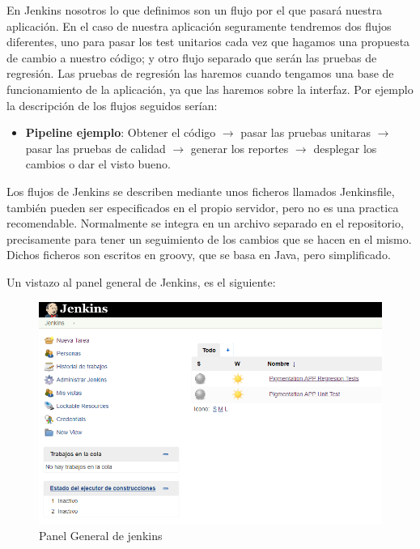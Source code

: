 En Jenkins nosotros lo que definimos son un flujo por el que pasará nuestra aplicación. En el caso de nuestra aplicación seguramente tendremos dos flujos diferentes, uno para pasar los test unitarios cada vez que hagamos una propuesta de cambio a nuestro código; y otro flujo separado que serán las pruebas de regresión. Las pruebas de regresión las haremos cuando tengamos una base de funcionamiento de la aplicación, ya que las haremos sobre la interfaz. Por ejemplo la descripción de los flujos seguidos serían:

\begin{itemize}
    \item \textbf{Pipeline ejemplo}: Obtener el código $\rightarrow$ pasar las pruebas unitaras $\rightarrow$ pasar las pruebas de calidad $\rightarrow$ generar los reportes $\rightarrow$ desplegar los cambios o dar el visto bueno.
\end{itemize}

Los flujos de Jenkins se describen mediante unos ficheros llamados Jenkinsfile, también pueden ser especificados en el propio servidor, pero no es una practica recomendable. Normalmente se integra en un archivo separado en el repositorio, precisamente para tener un seguimiento de los cambios que se hacen en el mismo. Dichos ficheros son escritos en groovy, que se basa en Java, pero simplificado. 

Un vistazo al panel general de Jenkins, es el siguiente:

\begin{figure}[H]
    \centering
    \includegraphics[scale=0.7]{imagenes/introduccion/mainJenkins.png}
    \caption{Panel General de jenkins}
    \label{fig:mainJenkins}
\end{figure}


